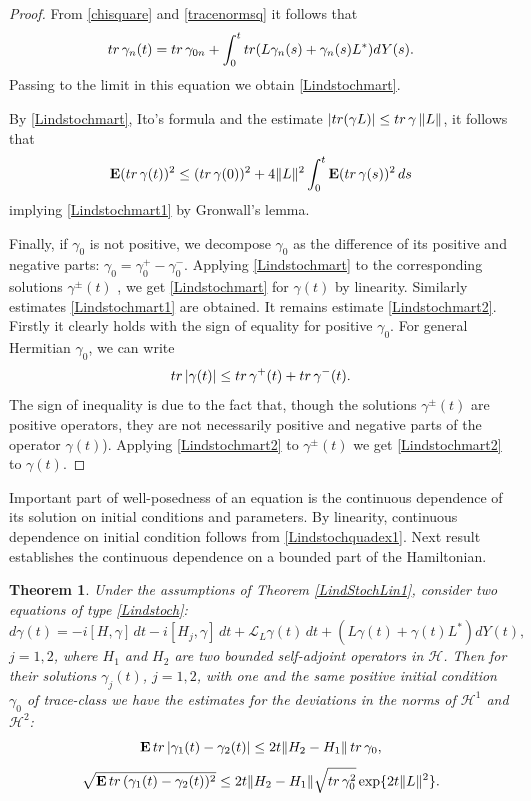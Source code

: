 \documentclass[10pt,a4paper]{amsart}
\def\LC{\mathcal{L}}
\def\HC{\mathcal{H}}
\def\E{\mathbf{E}}
\def\tr{\rm{tr}}
\def\ga{\gamma}
\newtheorem{theorem}{Theorem}[section]
\begin{document}
\begin{proof}
From \eqref{chisquare} and \eqref{tracenormsq} it follows that
\[
{\tr} \,\ga_n(t)={\tr} \, \ga_{0n}+\int_0^t {\tr} (L\ga_n(s)+\ga_n(s) L^*) dY(s).
\]
Passing to the limit in this equation
we obtain \eqref{Lindstochmart}.

By \eqref{Lindstochmart}, Ito's formula and the estimate
$|{\tr} (\ga L)|\le {\tr}\, \ga \,  \|L\|$, it follows that
 \[
 \E ({\tr}\, \ga(t))^2
 \le  ({\tr} \, \ga(0))^2+4 \|L\|^2 \int_0^t \E ({\tr} \, \ga(s))^2\,  ds
\]
implying \eqref{Lindstochmart1} by Gronwall's lemma.

Finally, if $\ga_0$ is not positive, we decompose $\ga_0$
as the difference of its positive and negative parts:
$\ga_0=\ga_0^+-\ga_0^-$. Applying  \eqref{Lindstochmart}
 to the corresponding solutions $\ga^{\pm}(t)$ , we get  \eqref{Lindstochmart} for $\ga(t)$
by linearity. Similarly estimates \eqref{Lindstochmart1} are obtained. It remains estimate \eqref{Lindstochmart2}.
Firstly it clearly holds with the sign of equality for positive $\ga_0$. For general Hermitian $\ga_0$,
we can write
\[
{\tr} \, |\ga(t)| \le {\tr} \, \ga^+(t) +{\tr} \, \ga^-(t).
\]
The sign of inequality is due to the fact that, though the solutions $\ga^{\pm}(t)$ are positive operators,
 they are not necessarily positive and negative parts of the operator $\ga(t)$).
Applying  \eqref{Lindstochmart2} to $\ga^{\pm}(t)$ we get \eqref{Lindstochmart2} to $\ga(t)$.
 \end{proof}

Important part of well-posedness of an equation is the continuous dependence of its solution on
 initial conditions and parameters. By linearity, continuous dependence on initial condition
 follows from \eqref{Lindstochquadex1}. Next result establishes the continuous dependence on
 a bounded part of the Hamiltonian.

\begin{theorem}
\label{LindStochLin2}
Under the assumptions of Theorem \ref{LindStochLin1},
consider two equations of type \eqref{Lindstoch}:
\begin{equation}
\label{Lindstochtwo}
d\ga(t)=-i[H,\ga] \, dt -i[H_j,\ga] \, dt+\LC_L \ga(t) \, dt +(L\ga(t)+\ga(t) L^*) dY(t),
\end{equation}
$j=1,2$, where $H_1$ and $H_2$ are two bounded self-adjoint operators in $\HC$.
Then for their solutions $\ga_j(t)$, $j=1,2$, with one and the same positive initial
condition $\ga_0$ of trace-class
we have the estimates for the deviations in the norms of $\HC^1$ and $\HC^2$:
\begin{equation}
\label{eqLindstochLin21}
\E \, {\tr}\, |\ga_1(t)-\ga_2(t)|\le 2 t \|H_2-H_1\| \, {\tr} \, \ga_0,
\end{equation}
\begin{equation}
\label{eqLindstochLin22}
\sqrt{\E \, {\tr}\, (\ga_1(t)-\ga_2(t))^2}
\le 2 t \|H_2-H_1\|\sqrt{ {\tr} \, \ga_0^2} \exp\{2t \|L\|^2\}.
\end{equation}
\end{theorem}
\end{document}
